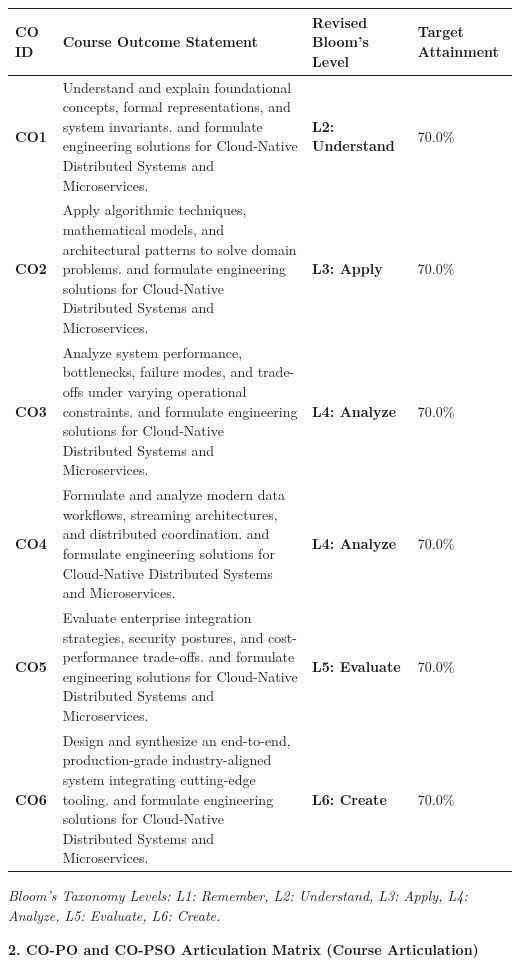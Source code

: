 \documentclass[10pt,a4paper]{article}
\begin{document}
\begin{table}[h!]
\centering
\begin{tabularx}{\textwidth}{C{1.5cm} Y C{3.8cm} C{2.2cm}}
\toprule
{}
\textbf{CO ID} & \textbf{Course Outcome Statement} & \textbf{Revised Bloom's Level} & \textbf{Target Attainment} \\
\midrule
\textbf{\color{nbaNavy}CO1} & Understand and explain foundational concepts, formal representations, and system invariants. and formulate engineering solutions for Cloud-Native Distributed Systems and Microservices. & \textbf{L2: Understand} & 70.0\% \\
 \hline \textbf{\color{nbaNavy}CO2} & Apply algorithmic techniques, mathematical models, and architectural patterns to solve domain problems. and formulate engineering solutions for Cloud-Native Distributed Systems and Microservices. & \textbf{L3: Apply} & 70.0\% \\
 \hline \textbf{\color{nbaNavy}CO3} & Analyze system performance, bottlenecks, failure modes, and trade-offs under varying operational constraints. and formulate engineering solutions for Cloud-Native Distributed Systems and Microservices. & \textbf{L4: Analyze} & 70.0\% \\
 \hline \textbf{\color{nbaNavy}CO4} & Formulate and analyze modern data workflows, streaming architectures, and distributed coordination. and formulate engineering solutions for Cloud-Native Distributed Systems and Microservices. & \textbf{L4: Analyze} & 70.0\% \\
 \hline \textbf{\color{nbaNavy}CO5} & Evaluate enterprise integration strategies, security postures, and cost-performance trade-offs. and formulate engineering solutions for Cloud-Native Distributed Systems and Microservices. & \textbf{L5: Evaluate} & 70.0\% \\
 \hline \textbf{\color{nbaNavy}CO6} & Design and synthesize an end-to-end, production-grade industry-aligned system integrating cutting-edge tooling. and formulate engineering solutions for Cloud-Native Distributed Systems and Microservices. & \textbf{L6: Create} & 70.0\% \\
\bottomrule
\end{tabularx}
\end{table}

\footnotesize\textit{Bloom's Taxonomy Levels: L1: Remember, L2: Understand, L3: Apply, L4: Analyze, L5: Evaluate, L6: Create.}
\normalsize

\vspace{8pt}
{\large\textbf{\color{nbaNavy}2. CO-PO and CO-PSO Articulation Matrix (Course Articulation)}}
\end{document}
